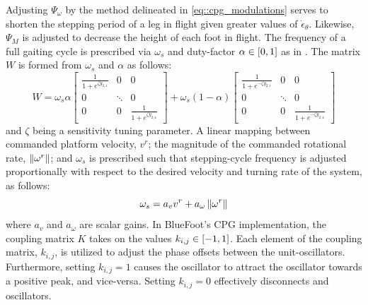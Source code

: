 			Adjusting $\Psi_{\omega}$ by the method delineated in \ref{eq::cpg_modulations} serves to shorten the stepping period of a leg in flight given greater values of $\dot{\epsilon}_{\theta}$. Likewise, $\Psi_{M}$ is adjusted to decrease the height of each foot in flight. The frequency of a full gaiting cycle is prescribed via $\omega_{s}$ and duty-factor $\alpha \in \left[0,1\right]$ as in \cite{Matos2010}. The matrix $W$ is formed from  $\omega_{s}$ and $\alpha$ as follows:
				\newcommand{\Wel}[1]{\frac{1}{1+e^{#1}}}
				\begin{equation}
						W = 
						\omega_{s}\alpha 
						\left[	
							\begin{array}{ccc}
								\Wel{\zeta y_{2,1}} 		& 0 			& 0  \\
								0 							& \ddots 		& 0  \\
								0							& 0		 		& \Wel{\zeta y_{2,4}}
							\end{array}
						\right] + 
						\omega_{s}(1-\alpha) 
						\left[	
							\begin{array}{cccc}
								\Wel{-\zeta y_{2,1}} 		& 0 			& 0  \\
								0 							& \ddots 		& 0  \\
								0							& 0		 		& \Wel{-\zeta y_{2,4}}
							\end{array}
						\right]
					\label{eq::cpg_W_matrix_def}
				\end{equation}
			and $\zeta$ being a sensitivity tuning parameter. A linear mapping between commanded platform velocity, $v^{r}$; the magnitude of the commanded rotational rate, $\left\lVert\omega^{r}\right\rVert$; and $\omega_{s}$ is prescribed such that stepping-cycle frequency is adjusted proportionally with respect to the desired velocity and turning rate of the system, as follows:
				\begin{equation}
					\omega_{s} = a_{v}v^{r} + a_{\omega}\left\lVert\omega^{r}\right\rVert
				\end{equation}
			where $a_{v}$ and $a_{\omega}$ are scalar gains. In BlueFoot's CPG implementation, the coupling matrix $K$ takes on the values $k_{i,j} \in \left[-1,1\right]$. Each element of the coupling matrix, $k_{i,j}$, is utilized to adjust the phase offsets between the unit-oscillators. Furthermore, setting $k_{i,j}=1$ causes the \Jth oscillator to attract the \Ith oscillator  towards a  positive peak, and vice-versa. Setting $k_{i,j}=0$ effectively disconnects \Ith and \Jth oscillators. 

